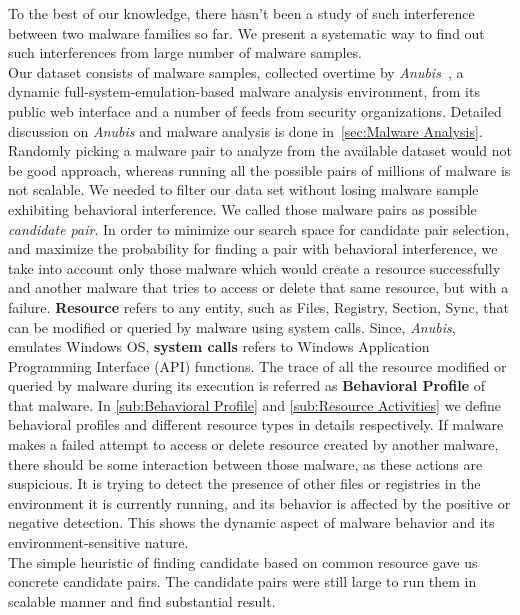 To the best of our knowledge, there hasn't been a study of such interference between two malware families so far.
We present a systematic way to find out such interferences from large number of malware samples.\\
Our dataset consists of {\gettotalmalwarei{}} malware samples, collected overtime by \emph{Anubis}~\cite[]{anubis}, a dynamic full-system-emulation-based malware analysis environment, from its public web interface and a number of feeds from security organizations.
Detailed discussion on \emph{Anubis} and malware analysis is done in~\autoref{sec:Malware Analysis}.
Randomly picking a malware pair to analyze from the available dataset would not be good approach, whereas running all the possible pairs of millions of malware is not scalable.
We needed to filter our data set without losing malware sample exhibiting behavioral interference.
We called those malware pairs as possible \emph{candidate pair}.
In order to minimize our search space for candidate pair selection, and maximize the probability for finding a pair with behavioral interference, we take into account only those malware which would create a resource successfully and another malware that tries to access or delete that same resource, but with a failure.
\textbf{Resource} refers to any entity, such as Files, Registry, Section, Sync, that can be modified or queried by malware using system calls.
Since, \emph{Anubis}, emulates Windows OS, \textbf{system calls} refers to Windows Application Programming Interface (API) functions.
The trace of all the resource modified or queried by malware during its execution is referred as \textbf{Behavioral Profile} of that malware.
In \autoref{sub:Behavioral Profile} and \autoref{sub:Resource Activities} we define behavioral profiles and different resource types in details respectively.
If malware makes a failed attempt to access or delete resource created by another malware, there should be some interaction between those malware, as these actions are suspicious.
It is trying to detect the presence of other files or registries in the environment it is currently running, and its behavior is affected by the positive or negative detection.
This shows the dynamic aspect of malware behavior and its environment-sensitive nature.\\
The simple heuristic of finding candidate based on common resource gave us concrete candidate pairs.
The candidate pairs were still large to run them in scalable manner and find substantial result.
